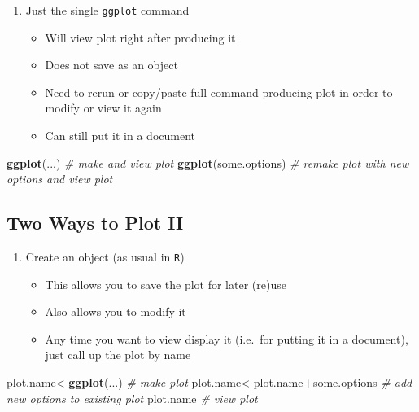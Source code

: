 \documentclass[]{book}
\newenvironment{Shaded}{\begin{snugshade}}{\end{snugshade}}
\newcommand{\KeywordTok}[1]{\textcolor[rgb]{0.13,0.29,0.53}{\textbf{#1}}}
\newcommand{\CommentTok}[1]{\textcolor[rgb]{0.56,0.35,0.01}{\textit{#1}}}
\newcommand{\OperatorTok}[1]{\textcolor[rgb]{0.81,0.36,0.00}{\textbf{#1}}}
\newcommand{\NormalTok}[1]{#1}
\providecommand{\tightlist}{%
  \setlength{\itemsep}{0pt}\setlength{\parskip}{0pt}}
\theoremstyle{definition}
\theoremstyle{definition}
\theoremstyle{definition}
\theoremstyle{remark}
\begin{document}
\begin{enumerate}
\def\labelenumi{\arabic{enumi}.}
\tightlist
\item
  Just the single \texttt{ggplot} command

  \begin{itemize}
  \tightlist
  \item
    Will view plot right after producing it
  \item
    Does not save as an object
  \item
    Need to rerun or copy/paste full command producing plot in order to
    modify or view it again
  \item
    Can still put it in a document
  \end{itemize}
\end{enumerate}

\begin{Shaded}
\begin{Highlighting}[]
\KeywordTok{ggplot}\NormalTok{(...) }\CommentTok{# make and view plot}
\KeywordTok{ggplot}\NormalTok{(some.options) }\CommentTok{# remake plot with new options and view plot}
\end{Highlighting}
\end{Shaded}

\subsection{Two Ways to Plot II}\label{two-ways-to-plot-ii}

\begin{enumerate}
\def\labelenumi{\arabic{enumi}.}
\setcounter{enumi}{1}
\tightlist
\item
  Create an object (as usual in \texttt{R})

  \begin{itemize}
  \tightlist
  \item
    This allows you to save the plot for later (re)use
  \item
    Also allows you to modify it
  \item
    Any time you want to view display it (i.e.~for putting it in a
    document), just call up the plot by name
  \end{itemize}
\end{enumerate}

\begin{Shaded}
\begin{Highlighting}[]
\NormalTok{plot.name<-}\KeywordTok{ggplot}\NormalTok{(...) }\CommentTok{# make plot}
\NormalTok{plot.name<-plot.name}\OperatorTok{+}\NormalTok{some.options }\CommentTok{# add new options to existing plot}
\NormalTok{plot.name }\CommentTok{# view plot }
\end{Highlighting}
\end{Shaded}
\end{document}
